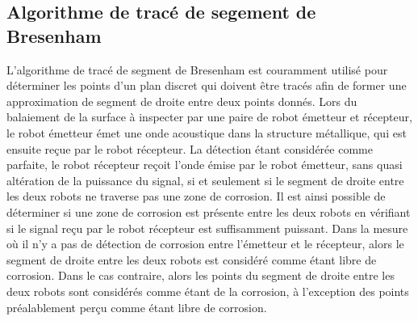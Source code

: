 \documentclass[francais,RandD]{rapportPFE}
\begin{document}
		\subsection*{Algorithme de tracé de segement de Bresenham}
			L'algorithme de tracé de segment de Bresenham est couramment utilisé pour déterminer les points d'un plan discret qui doivent être tracés afin de former une approximation de segment de droite entre deux points donnés.
			Lors du balaiement de la surface à inspecter par une paire de robot émetteur et récepteur, le robot émetteur émet une onde acoustique dans la structure métallique, qui est ensuite reçue par le robot récepteur.
			La détection étant considérée comme parfaite, le robot récepteur reçoit l'onde émise par le robot émetteur, sans quasi altération de la puissance du signal, si et seulement si le segment de droite entre les deux robots ne traverse pas une zone de corrosion.
			Il est ainsi possible de déterminer si une zone de corrosion est présente entre les deux robots en vérifiant si le signal reçu par le robot récepteur est suffisamment puissant.
			Dans la mesure où il n'y a pas de détection de corrosion entre l'émetteur et le récepteur, alors le segment de droite entre les deux robots est considéré comme étant libre de corrosion.
			Dans le cas contraire, alors les points du segment de droite entre les deux robots sont considérés comme étant de la corrosion, à l'exception des points préalablement perçu comme étant libre de corrosion.
\end{document}
